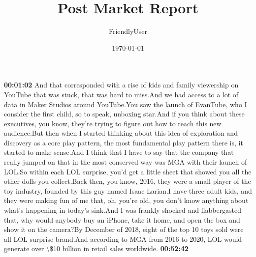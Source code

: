 \documentclass{article}%
\title{Post Market Report}%
\author{FriendlyUser}%
\date{\today}%
\begin{document}
%
\normalsize%
\textbf{00:01:02}%
\newline%
And that corresponded with a rise of kids and family viewership on YouTube that was stuck, that was hard to miss.And we had access to a lot of data in Maker Studios around YouTube.You saw the launch of EvanTube, who I consider the first child, so to speak, unboxing star.And if you think about these executives, you know, they're trying to figure out how to reach this new audience.But then when I started thinking about this idea of exploration and discovery as a core play pattern, the most fundamental play pattern there is, it started to make sense.And I think that I have to say that the company that really jumped on that in the most conserved way was MGA with their launch of LOL.So within each LOL surprise, you'd get a little sheet that showed you all the other dolls you collect.Back then, you know, 2016, they were a small player of the toy industry, founded by this guy named Isaac Larian.I have three adult kids, and they were making fun of me that, oh, you're old, you don't know anything about what's happening in today's sink.And I was frankly shocked and flabbergasted that, why would anybody buy an iPhone, take it home, and open the box and show it on the camera?By December of 2018, eight of the top 10 toys sold were all LOL surprise brand.And according to MGA from 2016 to 2020, LOL would generate over \textbackslash{}\$10 billion in retail sales worldwide.%
\textbf{00:52:42}%
\newline%
\end{document}
